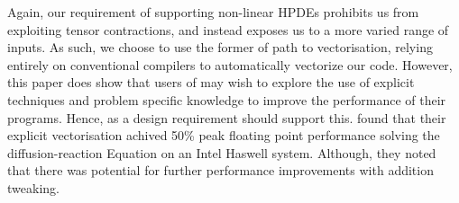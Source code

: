 Again, our requirement of supporting non-linear HPDEs prohibits us from exploiting tensor contractions, and instead exposes us to a more varied range of inputs.
As such, we choose to use the former of  \citeauthor{codegen_dg_SIMD} path to vectorisation, relying entirely on conventional compilers to automatically vectorize our code.
However, this paper does show that users of \phlat may wish to explore the use of explicit techniques and problem specific knowledge to improve the performance of their programs.
Hence, as a design requirement \phlat should support this.
\citeauthor{codegen_dg_SIMD} found that their explicit vectorisation achived 50\% peak floating point performance solving the diffusion-reaction Equation on an Intel Haswell system.
Although, they noted that there was potential for further performance improvements with addition tweaking.  
